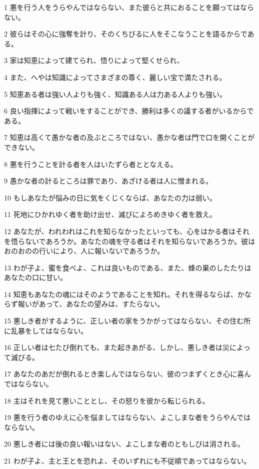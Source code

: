 \par 1 悪を行う人をうらやんではならない、また彼らと共におることを願ってはならない。
\par 2 彼らはその心に強奪を計り、そのくちびるに人をそこなうことを語るからである。
\par 3 家は知恵によって建てられ、悟りによって堅くせられ、
\par 4 また、へやは知識によってさまざまの尊く、麗しい宝で満たされる。
\par 5 知恵ある者は強い人よりも強く、知識ある人は力ある人よりも強い。
\par 6 良い指揮によって戦いをすることができ、勝利は多くの議する者がいるからである。
\par 7 知恵は高くて愚かな者の及ぶところではない、愚かな者は門で口を開くことができない。
\par 8 悪を行うことを計る者を人はいたずら者ととなえる。
\par 9 愚かな者の計るところは罪であり、あざける者は人に憎まれる。
\par 10 もしあなたが悩みの日に気をくじくならば、あなたの力は弱い。
\par 11 死地にひかれゆく者を助け出せ、滅びによろめきゆく者を救え。
\par 12 あなたが、われわれはこれを知らなかったといっても、心をはかる者はそれを悟らないであろうか。あなたの魂を守る者はそれを知らないであろうか。彼はおのおのの行いにより、人に報いないであろうか。
\par 13 わが子よ、蜜を食べよ、これは良いものである、また、蜂の巣のしたたりはあなたの口に甘い。
\par 14 知恵もあなたの魂にはそのようであることを知れ。それを得るならば、かならず報いがあって、あなたの望みは、すたらない。
\par 15 悪しき者がするように、正しい者の家をうかがってはならない、その住む所に乱暴をしてはならない。
\par 16 正しい者は七たび倒れても、また起きあがる、しかし、悪しき者は災によって滅びる。
\par 17 あなたのあだが倒れるとき楽しんではならない、彼のつまずくとき心に喜んではならない。
\par 18 主はそれを見て悪いこととし、その怒りを彼から転じられる。
\par 19 悪を行う者のゆえに心を悩ましてはならない、よこしまな者をうらやんではならない。
\par 20 悪しき者には後の良い報いはない、よこしまな者のともしびは消される。
\par 21 わが子よ、主と王とを恐れよ、そのいずれにも不従順であってはならない。
